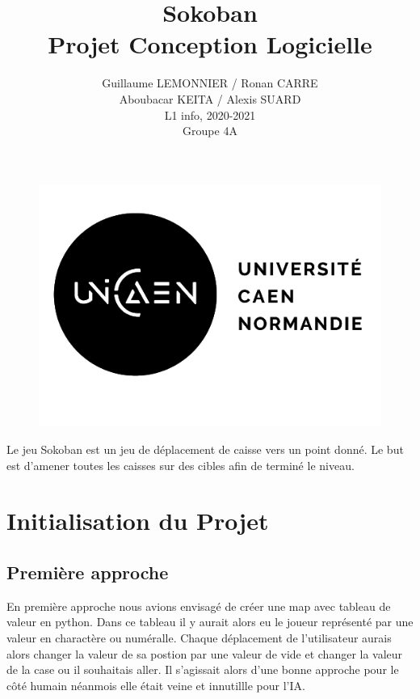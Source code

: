 \documentclass[a4paper,12pt]{article} %
\author{Guillaume LEMONNIER / Ronan CARRE\\Aboubacar KEITA / Alexis SUARD\\L1 info, 2020-2021\\Groupe 4A}
\title{Sokoban\\Projet Conception Logicielle}
\begin{document}
\begin{figure}

    \includegraphics[scale = 0.5]{../picture/unicaen.png}

\end{figure}

\maketitle

Le jeu Sokoban est un jeu de déplacement de caisse vers un point donné.
Le but est d'amener toutes les caisses sur des cibles afin de terminé le niveau.

\newpage

\tableofcontents

\newpage

\section{Initialisation du Projet}

\subsection{Première approche}

En première approche nous avions envisagé de créer une map avec tableau de valeur en python.
Dans ce tableau il y aurait alors eu le joueur représenté par une valeur en charactère ou numéralle.
Chaque déplacement de l'utilisateur aurais alors changer la valeur de sa postion par une valeur de vide et changer la valeur de la case ou il souhaitais aller.
Il s'agissait alors d'une bonne approche pour le côté humain néanmois elle était veine et innutillle pour l'IA.
\end{document}
